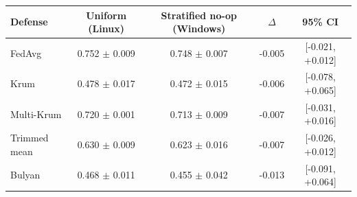 \begin{tabular}{lcccc}
\toprule
Defense & Uniform (Linux) & Stratified no-op (Windows) & $\Delta$ & 95\% CI \\
\midrule
FedAvg & 0.752 $\pm$ 0.009 & 0.748 $\pm$ 0.007 & -0.005 & [-0.021, +0.012] \\
Krum & 0.478 $\pm$ 0.017 & 0.472 $\pm$ 0.015 & -0.006 & [-0.078, +0.065] \\
Multi-Krum & 0.720 $\pm$ 0.001 & 0.713 $\pm$ 0.009 & -0.007 & [-0.031, +0.016] \\
Trimmed mean & 0.630 $\pm$ 0.009 & 0.623 $\pm$ 0.016 & -0.007 & [-0.026, +0.012] \\
Bulyan & 0.468 $\pm$ 0.011 & 0.455 $\pm$ 0.042 & -0.013 & [-0.091, +0.064] \\
\bottomrule
\end{tabular}
